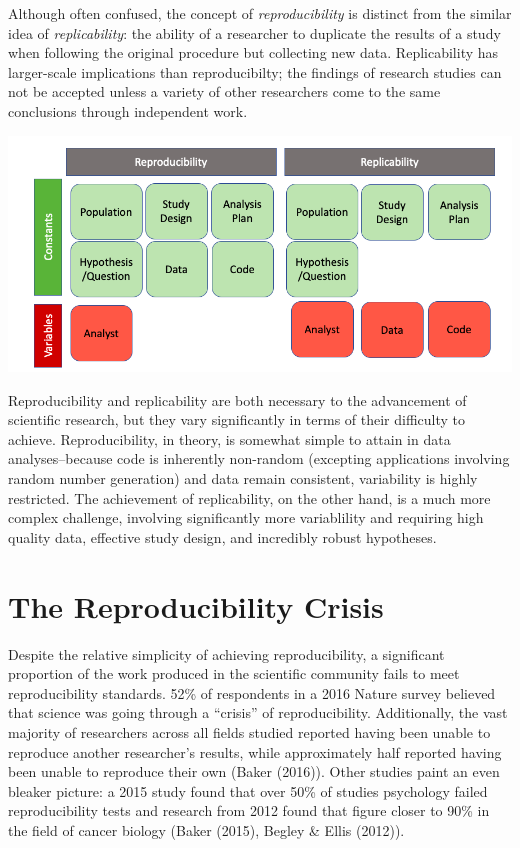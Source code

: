 \documentclass[12pt,twoside]{reedthesis}
\begin{document}
Although often confused, the concept of \emph{reproducibility} is
distinct from the similar idea of \emph{replicability}: the ability of a
researcher to duplicate the results of a study when following the
original procedure but collecting new data. Replicability has
larger-scale implications than reproducibilty; the findings of research
studies can not be accepted unless a variety of other researchers come
to the same conclusions through independent work.

\includegraphics[width=1\linewidth]{figure/versus}

Reproducibility and replicability are both necessary to the advancement
of scientific research, but they vary significantly in terms of their
difficulty to achieve. Reproducibility, in theory, is somewhat simple to
attain in data analyses--because code is inherently non-random
(excepting applications involving random number generation) and data
remain consistent, variability is highly restricted. The achievement of
replicability, on the other hand, is a much more complex challenge,
involving significantly more variablility and requiring high quality
data, effective study design, and incredibly robust hypotheses.

\section{The Reproducibility Crisis}\label{the-reproducibility-crisis}

Despite the relative simplicity of achieving reproducibility, a
significant proportion of the work produced in the scientific community
fails to meet reproducibility standards. 52\% of respondents in a 2016
Nature survey believed that science was going through a ``crisis'' of
reproducibility. Additionally, the vast majority of researchers across
all fields studied reported having been unable to reproduce another
researcher's results, while approximately half reported having been
unable to reproduce their own (Baker (2016)). Other studies paint an
even bleaker picture: a 2015 study found that over 50\% of studies
psychology failed reproducibility tests and research from 2012 found
that figure closer to 90\% in the field of cancer biology (Baker (2015),
Begley \& Ellis (2012)).
\end{document}
